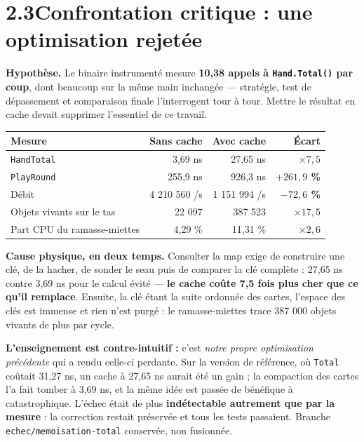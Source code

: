 \documentclass[10pt,a4paper]{article}
\newcommand{\loss}[1]{{\color{bad}\bfseries #1}}
\newcommand{\code}[1]{\texttt{\small #1}}
\begin{document}
\section{2.3\quad Confrontation critique : une optimisation rejetée}

\textbf{Hypothèse.} Le binaire instrumenté mesure \textbf{10,38 appels à
\code{Hand.Total()} par coup}, dont beaucoup sur la même main inchangée — stratégie, test
de dépassement et comparaison finale l'interrogent tour à tour. Mettre le résultat en
cache devait supprimer l'essentiel de ce travail.

\vspace{2pt}
\begin{tabularx}{\textwidth}{@{}>{\small}X >{\small}r >{\small}r >{\small}r@{}}
\toprule
\textbf{\small Mesure} & \textbf{\small Sans cache} & \textbf{\small Avec cache} & \textbf{\small Écart}\\
\midrule
\code{HandTotal} & 3,69 ns & 27,65 ns & \loss{$\times 7{,}5$}\\
\code{PlayRound} & 255,9 ns & 926,3 ns & \loss{$+261{,}9$ \%}\\
Débit & 4 210 560 /s & 1 151 994 /s & \loss{$-72{,}6$ \%}\\
Objets vivants sur le tas & 22 097 & 387 523 & \loss{$\times 17{,}5$}\\
Part CPU du ramasse-miettes & 4,29 \% & 11,31 \% & \loss{$\times 2{,}6$}\\
\bottomrule
\end{tabularx}

\vspace{3pt}
\textbf{Cause physique, en deux temps.} Consulter la map exige de construire une clé, de
la hacher, de sonder le seau puis de comparer la clé complète : 27,65 ns contre 3,69 ns
pour le calcul évité — \textbf{le cache coûte 7,5 fois plus cher que ce qu'il remplace}.
Ensuite, la clé étant la suite ordonnée des cartes, l'espace des clés est immense et rien
n'est purgé : le ramasse-miettes trace 387 000 objets vivants de plus par cycle.

\textbf{L'enseignement est contre-intuitif :} c'est \emph{notre propre optimisation
précédente} qui a rendu celle-ci perdante. Sur la version de référence, où \code{Total}
coûtait 31,27 ns, un cache à 27,65 ns aurait été un gain ; la compaction des cartes l'a
fait tomber à 3,69 ns, et la même idée est passée de bénéfique à catastrophique. L'échec
était de plus \textbf{indétectable autrement que par la mesure} : la correction restait
préservée et tous les tests passaient. Branche \code{echec/memoisation-total} conservée,
non fusionnée.
\end{document}
